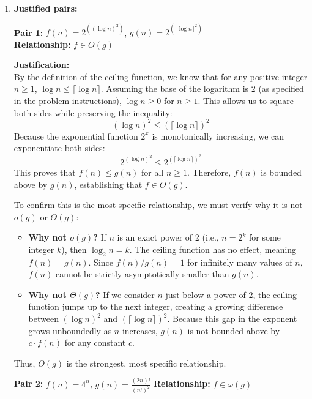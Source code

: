 \documentclass[11pt]{article}
\begin{document}
\begin{enumerate}[label=\textbf{(\alph*)}]
\item \textbf{Justified pairs:}

\textbf{Pair 1:} $f(n) = 2^{((\log n)^2)}$, $g(n) = 2^{(\lceil\log n\rceil^2)}$ \\
\textbf{Relationship:} $f \in O(g)$

\textbf{Justification:}\\
By the definition of the ceiling function, we know that for any positive integer $n \ge 1$, $\log n \le \lceil \log n \rceil$. Assuming the base of the logarithm is $2$ (as specified in the problem instructions), $\log n \ge 0$ for $n \ge 1$. This allows us to square both sides while preserving the inequality:
\[ 
(\log n)^2 \le (\lceil \log n \rceil)^2 
\]
Because the exponential function $2^x$ is monotonically increasing, we can exponentiate both sides:
\[ 
2^{(\log n)^2} \le 2^{(\lceil \log n \rceil)^2} 
\]
This proves that $f(n) \le g(n)$ for all $n \ge 1$. Therefore, $f(n)$ is bounded above by $g(n)$, establishing that $f \in O(g)$.

To confirm this is the most specific relationship, we must verify why it is not $o(g)$ or $\Theta(g)$:
\begin{itemize}
    \item \textbf{Why not $o(g)$?} If $n$ is an exact power of 2 (i.e., $n = 2^k$ for some integer $k$), then $\log_2 n = k$. The ceiling function has no effect, meaning $f(n) = g(n)$. Since $f(n) / g(n) = 1$ for infinitely many values of $n$, $f(n)$ cannot be strictly asymptotically smaller than $g(n)$.
    \item \textbf{Why not $\Theta(g)$?} If we consider $n$ just below a power of 2, the ceiling function jumps up to the next integer, creating a growing difference between $(\log n)^2$ and $(\lceil \log n \rceil)^2$. Because this gap in the exponent grows unboundedly as $n$ increases, $g(n)$ is not bounded above by $c \cdot f(n)$ for any constant $c$.
\end{itemize}
Thus, $O(g)$ is the strongest, most specific relationship.
\medskip


\textbf{Pair 2:} $f(n) = 4^n$, $g(n) = \frac{(2n)!}{(n!)^2}$
\textbf{Relationship:} $f \in \omega(g)$


\end{enumerate}
\end{document}
